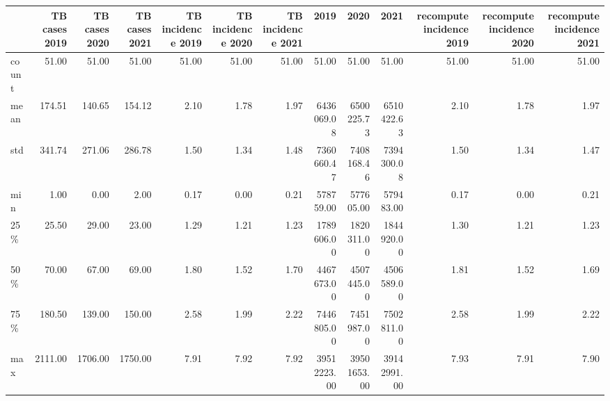 \documentclass[
  letterpaper,
  DIV=11,
  numbers=noendperiod]{scrreprt}
\begin{document}
\begin{tabular}{lrrrrrrrrrrrr}
\toprule
{} &  TB cases 2019 &  TB cases 2020 &  TB cases 2021 &  TB incidence 2019 &  TB incidence 2020 &  TB incidence 2021 &        2019 &        2020 &        2021 &  recompute incidence 2019 &  recompute incidence 2020 &  recompute incidence 2021 \\
\midrule
count &          51.00 &          51.00 &          51.00 &              51.00 &              51.00 &              51.00 &       51.00 &       51.00 &       51.00 &                     51.00 &                     51.00 &                     51.00 \\
mean  &         174.51 &         140.65 &         154.12 &               2.10 &               1.78 &               1.97 &  6436069.08 &  6500225.73 &  6510422.63 &                      2.10 &                      1.78 &                      1.97 \\
std   &         341.74 &         271.06 &         286.78 &               1.50 &               1.34 &               1.48 &  7360660.47 &  7408168.46 &  7394300.08 &                      1.50 &                      1.34 &                      1.47 \\
min   &           1.00 &           0.00 &           2.00 &               0.17 &               0.00 &               0.21 &   578759.00 &   577605.00 &   579483.00 &                      0.17 &                      0.00 &                      0.21 \\
25\%   &          25.50 &          29.00 &          23.00 &               1.29 &               1.21 &               1.23 &  1789606.00 &  1820311.00 &  1844920.00 &                      1.30 &                      1.21 &                      1.23 \\
50\%   &          70.00 &          67.00 &          69.00 &               1.80 &               1.52 &               1.70 &  4467673.00 &  4507445.00 &  4506589.00 &                      1.81 &                      1.52 &                      1.69 \\
75\%   &         180.50 &         139.00 &         150.00 &               2.58 &               1.99 &               2.22 &  7446805.00 &  7451987.00 &  7502811.00 &                      2.58 &                      1.99 &                      2.22 \\
max   &        2111.00 &        1706.00 &        1750.00 &               7.91 &               7.92 &               7.92 & 39512223.00 & 39501653.00 & 39142991.00 &                      7.93 &                      7.91 &                      7.90 \\
\bottomrule
\end{tabular}
\end{document}

